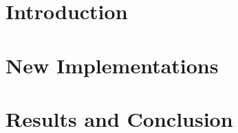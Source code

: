 \documentclass[hidelinks,oneside]{scrbook}			%
\begin{document}
\thispagestyle{empty} \clearpage										%
\pagestyle{plain}  %



\tableofcontents
\chapter{Introduction}


%
%
%
\chapter{New Implementations}





%
\chapter{Results and Conclusion}



\newpage

    

    
    

%
\newpage


 

%
\end{document}
